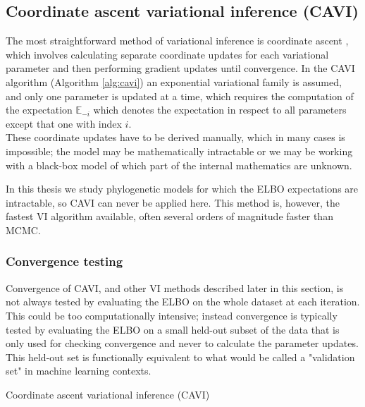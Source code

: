 \subsection{Coordinate ascent variational inference (CAVI)} \label{sec:cavi}

The most straightforward method of variational inference is coordinate ascent \parencite{vi-review}, which involves calculating separate coordinate updates for each variational parameter and then performing gradient updates until convergence. In the CAVI algorithm (Algorithm \ref{alg:cavi}) an exponential variational family is assumed, and only one parameter is updated at a time, which requires the computation of the expectation $\mathbb{E}_{-i}$ which denotes the expectation in respect to all parameters except that one with index $i$.
\\
These coordinate updates have to be derived manually, which in many cases is impossible; the model may be mathematically intractable or we may be working with a black-box model of which part of the internal mathematics are unknown.
    
\medskip
\par In this thesis we study phylogenetic models for which the ELBO expectations are intractable, so CAVI can never be applied here. This method is, however, the fastest VI algorithm available, often several orders of magnitude faster than MCMC.


\subsubsection{Convergence testing}
Convergence of CAVI, and other VI methods described later in this section, is not always tested by evaluating the ELBO on the whole dataset at each iteration. This could be too computationally intensive; instead convergence is typically tested by evaluating the ELBO on a small held-out subset of the data that is only used for checking convergence and never to calculate the parameter updates. This held-out set is functionally equivalent to what would be called a "validation set" in machine learning contexts.



\begin{algorithm}
    \label{alg:cavi}
    \caption{Coordinate ascent variational inference (CAVI)}
\end{algorithm}



